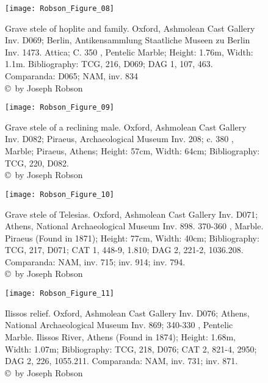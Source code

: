 \begin{figure}[!p]
	\texttt{[image: Robson\_Figure\_08]}

	\caption{Grave stele of hoplite and family. Oxford, Ashmolean Cast Gallery Inv. D069; Berlin, Antikensammlung Staatliche Museen zu Berlin Inv. 1473. Attica; C. 350 \BC, Pentelic Marble; Height: 1.76m, Width: 1.1m. Bibliography: TCG, 216, D069; DAG 1, 107, 463.
		Comparanda: D065; NAM, inv. 834
		{\normalfont\scriptsize \\ \copyright\ by Joseph Robson}}
	\label{fig:Robson_Figure_08}
\end{figure}

\begin{figure}[!p]
	\texttt{[image: Robson\_Figure\_09]}

	\caption{Grave stele of a reclining male. Oxford, Ashmolean Cast Gallery Inv. D082; Piraeus, Archaeological Museum Inv. 208; c. 380 \BC, Marble; Piraeus, Athens; Height: 57cm, Width: 64cm; Bibliography: TCG, 220, D082.
		{\normalfont\scriptsize \\ \copyright\ by Joseph Robson}}
	\label{fig:Robson_Figure_09}
\end{figure}

\begin{figure}[!p]
	\texttt{[image: Robson\_Figure\_10]}

	\caption{Grave stele of Telesias. Oxford, Ashmolean Cast Gallery Inv. D071; Athens, National Archaeological Museum Inv. 898. 370-360 \BC, Marble. Piraeus (Found in 1871); Height: 77cm, Width: 40cm; Bibliography: TCG, 217, D071; CAT 1, 448-9, 1.810; DAG 2, 221-2, 1036.208.
		Comparanda: NAM, inv. 715; inv. 914; inv. 794.
		{\normalfont\scriptsize \\ \copyright\ by Joseph Robson}}
	\label{fig:Robson_Figure_10}
\end{figure}

\begin{figure}[!p]
	\texttt{[image: Robson\_Figure\_11]}

	\caption{Ilissos relief. Oxford, Ashmolean Cast Gallery Inv. D076; Athens, National Archaeological Museum Inv. 869; 340-330 \BC, Pentelic Marble. Ilissos River, Athens (Found in 1874); Height: 1.68m, Width: 1.07m; Bibliography: TCG, 218, D076; CAT 2, 821-4, 2950; DAG 2, 226, 1055.211.
		Comparanda: NAM, inv. 731; inv. 871.
		{\normalfont\scriptsize \\ \copyright\ by Joseph Robson}}
	\label{fig:Robson_Figure_11}
\end{figure}

